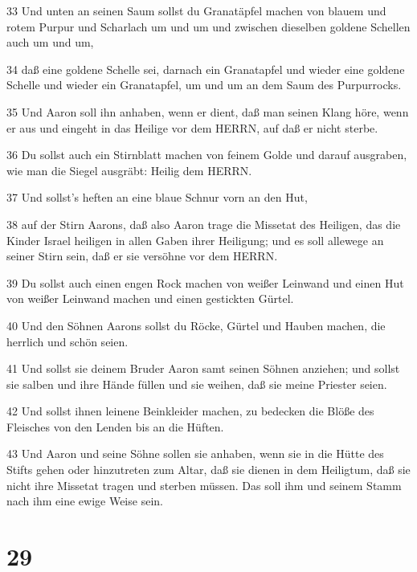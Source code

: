 \par 33 Und unten an seinen Saum sollst du Granatäpfel machen von blauem und rotem Purpur und Scharlach um und um und zwischen dieselben goldene Schellen auch um und um,
\par 34 daß eine goldene Schelle sei, darnach ein Granatapfel und wieder eine goldene Schelle und wieder ein Granatapfel, um und um an dem Saum des Purpurrocks.
\par 35 Und Aaron soll ihn anhaben, wenn er dient, daß man seinen Klang höre, wenn er aus und eingeht in das Heilige vor dem HERRN, auf daß er nicht sterbe.
\par 36 Du sollst auch ein Stirnblatt machen von feinem Golde und darauf ausgraben, wie man die Siegel ausgräbt: Heilig dem HERRN.
\par 37 Und sollst's heften an eine blaue Schnur vorn an den Hut,
\par 38 auf der Stirn Aarons, daß also Aaron trage die Missetat des Heiligen, das die Kinder Israel heiligen in allen Gaben ihrer Heiligung; und es soll allewege an seiner Stirn sein, daß er sie versöhne vor dem HERRN.
\par 39 Du sollst auch einen engen Rock machen von weißer Leinwand und einen Hut von weißer Leinwand machen und einen gestickten Gürtel.
\par 40 Und den Söhnen Aarons sollst du Röcke, Gürtel und Hauben machen, die herrlich und schön seien.
\par 41 Und sollst sie deinem Bruder Aaron samt seinen Söhnen anziehen; und sollst sie salben und ihre Hände füllen und sie weihen, daß sie meine Priester seien.
\par 42 Und sollst ihnen leinene Beinkleider machen, zu bedecken die Blöße des Fleisches von den Lenden bis an die Hüften.
\par 43 Und Aaron und seine Söhne sollen sie anhaben, wenn sie in die Hütte des Stifts gehen oder hinzutreten zum Altar, daß sie dienen in dem Heiligtum, daß sie nicht ihre Missetat tragen und sterben müssen. Das soll ihm und seinem Stamm nach ihm eine ewige Weise sein.

\chapter{29}

